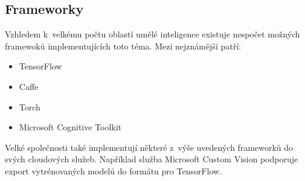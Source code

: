 \subsection{Frameworky}
Vzhledem k~velkému počtu oblastí umělé inteligence existuje nespočet možných framewoků implementujících toto téma. Mezi nejznámější patří:
\begin{itemize}
	\item TensorFlow
	\item Caffe
	\item Torch
	\item Microsoft Cognitive Toolkit
\end{itemize}

Velké společnosti také implementují některé z~výše uvedených frameworků do svých cloudových služeb. Například služba Microsoft Custom Vision podporuje export vytrénovaných modelů do formátu pro TensorFlow.